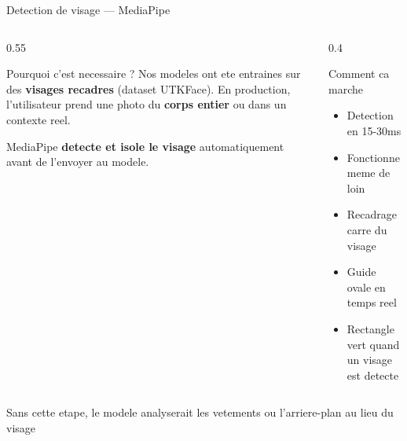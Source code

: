 \documentclass[aspectratio=169, 12pt]{beamer}
\begin{document}
\begin{frame}{Detection de visage --- MediaPipe}

\begin{columns}[T]
\begin{column}{0.55\textwidth}
\begin{block}{Pourquoi c'est necessaire ?}
Nos modeles ont ete entraines sur des \textbf{visages recadres} (dataset UTKFace). En production, l'utilisateur prend une photo du \textbf{corps entier} ou dans un contexte reel.

\vspace{0.2cm}
MediaPipe \textbf{detecte et isole le visage} automatiquement avant de l'envoyer au modele.
\end{block}
\end{column}

\begin{column}{0.4\textwidth}
\begin{exampleblock}{Comment ca marche}
\begin{itemize}
    \item Detection en 15-30ms
    \item Fonctionne meme de loin
    \item Recadrage carre du visage
    \item Guide ovale en temps reel
    \item Rectangle vert quand un visage est detecte
\end{itemize}
\end{exampleblock}
\end{column}
\end{columns}

\vspace{0.2cm}
\centering
{\small\color{accent} Sans cette etape, le modele analyserait les vetements ou l'arriere-plan au lieu du visage}
\end{frame}
\end{document}

